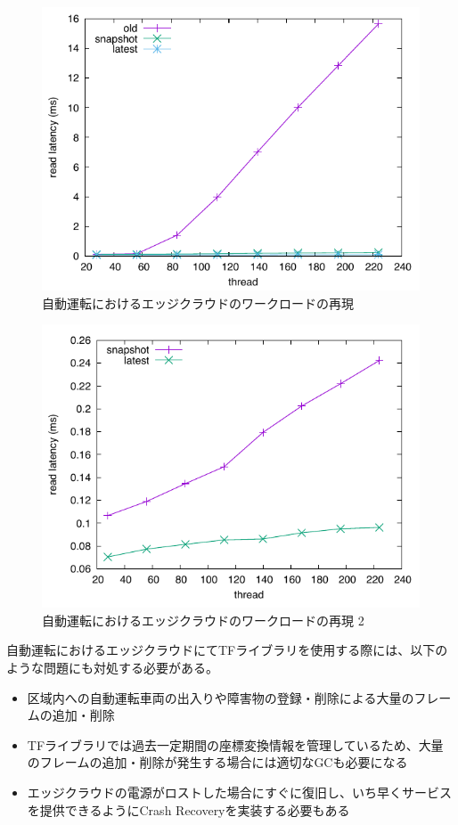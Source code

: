 \documentclass[a4paper]{jreport}	%
\begin{document}
\begin{figure}[h] 
\centering
\includegraphics[width=15cm]{car}
\caption{自動運転におけるエッジクラウドのワークロードの再現}
\label{fig:car-read-latency}
\end{figure}


\begin{figure}[h] 
\centering
\includegraphics[width=15cm]{car2}
\caption{自動運転におけるエッジクラウドのワークロードの再現 2}
\label{fig:car-read-latency2}
\end{figure}


自動運転におけるエッジクラウドにてTFライブラリを使用する際には、以下のような問題にも対処する必要がある。
\begin{itemize}     
	\item 区域内への自動運転車両の出入りや障害物の登録・削除による大量のフレームの追加・削除
	\item TFライブラリでは過去一定期間の座標変換情報を管理しているため、大量のフレームの追加・削除が発生する場合には適切なGCも必要になる
	\item エッジクラウドの電源がロストした場合にすぐに復旧し、いち早くサービスを提供できるようにCrash Recoveryを実装する必要もある
\end{itemize}
\end{document}
